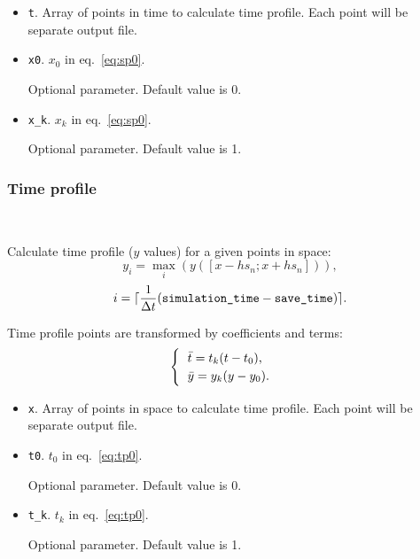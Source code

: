 \begin{itemize}
    \item \verb|t|. Array of points in time to calculate time profile. Each point will be separate output file.
    \item \verb|x0|. $x_{0}$ in eq.~\ref{eq:sp0}.
    
    Optional parameter. Default value is 0.
    \item \verb|x_k|. $x_{k}$ in eq.~\ref{eq:sp0}.
    
    Optional parameter. Default value is 1.
\end{itemize}

\subsubsection{Time profile}\

Calculate time profile ($y$ values) for a given points in space:
\begin{equation}
    y_{i} = \max\limits_{i}(y([x - hs_{n}; x + hs_{n}])),
\end{equation}
\begin{equation}
    i = \lceil \frac{1}{\Delta t} (\verb|simulation_time| - \verb|save_time|) \rceil.
\end{equation}

Time profile points are transformed by coefficients and terms:
\begin{equation}\label{eq:tp0}
    \begin{cases}
      \begin{tabular}{l}
          $\Bar{t} = t_{k} (t - t_{0})$, 
          \\
          $\Bar{y} = y_{k} (y - y_{0})$.
      \end{tabular}  
    \end{cases} 
\end{equation}

\begin{itemize}
    \item \verb|x|. Array of points in space to calculate time profile. Each point will be separate output file.
    
    \item \verb|t0|. $t_{0}$ in eq.~\ref{eq:tp0}.
    
    Optional parameter. Default value is 0.
    \item \verb|t_k|. $t_{k}$ in eq.~\ref{eq:tp0}.

    Optional parameter. Default value is 1.
\end{itemize}